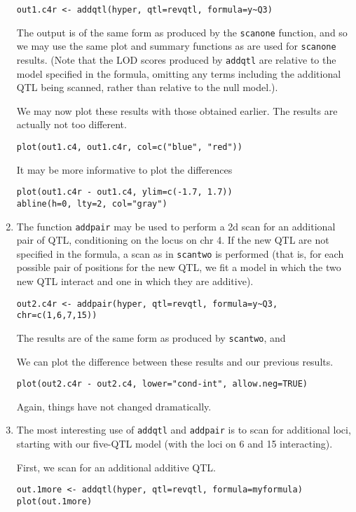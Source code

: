 \documentclass[10pt,letterpaper]{article}
\newcommand{\usercolor}{\color [named]{BlueViolet}}
\begin{document}
\begin{enumerate}
\usercolor
\verb|out1.c4r <- addqtl(hyper, qtl=revqtl, formula=y~Q3)|
\normalcolor

The output is of the same form as produced by the \verb-scanone-
function, and so we may use the same plot and summary functions as are
used for \verb-scanone- results.  (Note that the LOD scores produced
by \verb-addqtl- are relative to the model specified in the formula,
omitting any terms including the additional QTL being scanned, rather
than relative to the null model.).

We may now plot these results with those obtained earlier.  The
results are actually not too different. 

\usercolor
\verb|plot(out1.c4, out1.c4r, col=c("blue", "red"))| 
\normalcolor

It may be more informative to plot the differences

\usercolor
\verb|plot(out1.c4r - out1.c4, ylim=c(-1.7, 1.7))| \\
\verb|abline(h=0, lty=2, col="gray")|
\normalcolor

\item The function \verb-addpair- may be used to perform a 2d scan for
  an additional pair of QTL, conditioning on the locus on chr 4.  If
  the new QTL are not specified in the formula, a scan as in
  \verb-scantwo- is performed (that is, for each possible pair of
  positions for the new QTL, we fit a model in which the two new QTL
  interact and one in which they are additive).

\usercolor
\verb|out2.c4r <- addpair(hyper, qtl=revqtl, formula=y~Q3, chr=c(1,6,7,15))|
\normalcolor

The results are of the same form as produced by \verb-scantwo-, and

We can plot the difference between these results and our previous
results.

\usercolor
\verb|plot(out2.c4r - out2.c4, lower="cond-int", allow.neg=TRUE)|
\normalcolor

Again, things have not changed dramatically.

\item The most interesting use of \verb-addqtl- and \verb-addpair- is
  to scan for additional loci, starting with our five-QTL model (with
  the loci on 6 and 15 interacting).

  First, we scan for an additional additive QTL.

\usercolor
\verb|out.1more <- addqtl(hyper, qtl=revqtl, formula=myformula)| \\
\verb|plot(out.1more)| 
\normalcolor


\end{enumerate}
\end{document}
